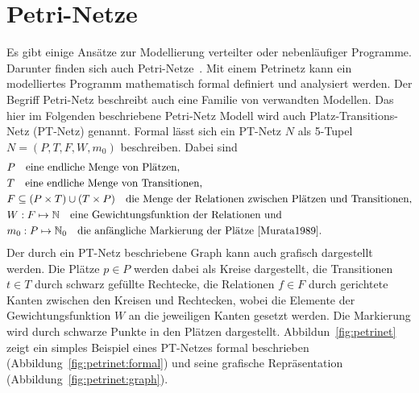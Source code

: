 \section{Petri-Netze}\label{sec:petri}
Es gibt einige Ansätze zur Modellierung verteilter oder nebenläufiger Programme. Darunter finden sich auch Petri-Netze~\cite{Murata1989}. Mit einem Petrinetz kann ein modelliertes Programm mathematisch formal definiert und analysiert werden. Der Begriff Petri-Netz beschreibt auch eine Familie von verwandten Modellen. Das hier im Folgenden beschriebene Petri-Netz Modell wird auch Platz-Transitions-Netz (PT-Netz) genannt. Formal lässt sich ein PT-Netz $N$ als 5-Tupel $ N=(P,T,F,W,m_0)$ beschreiben. Dabei sind 
\begin{align*}
	&P  \quad \text{eine endliche Menge von Plätzen,}\\
	&T  \quad \text{eine endliche Menge von Transitionen,}\\
	&F \subseteq (P\times T) \cup (T \times P) \quad \text{die Menge der Relationen zwischen Plätzen und Transitionen,}\\
	&W: F \mapsto \mathbb{N}  \quad \text{eine Gewichtungsfunktion der Relationen und}\\
	&m_0: P \mapsto \mathbb{N}_0   \quad \text{die anfängliche Markierung der Plätze~\cite{Murata1989}.}\\
\end{align*}
Der durch ein PT-Netz beschriebene Graph kann auch grafisch dargestellt werden. Die Plätze $p \in P$ werden dabei als Kreise dargestellt, die Transitionen $ t \in T$ durch schwarz gefüllte Rechtecke, die Relationen $ f \in F$ durch gerichtete Kanten zwischen den Kreisen und Rechtecken, wobei die Elemente der Gewichtungsfunktion $W$ an die jeweiligen Kanten gesetzt werden. Die Markierung wird durch schwarze Punkte in den Plätzen dargestellt. Abbildun~\ref{fig:petrinet} zeigt ein simples Beispiel eines PT-Netzes  formal beschrieben (Abbildung~\ref{fig:petrinet:formal}) und seine grafische Repräsentation (Abbildung~\ref{fig:petrinet:graph}).
